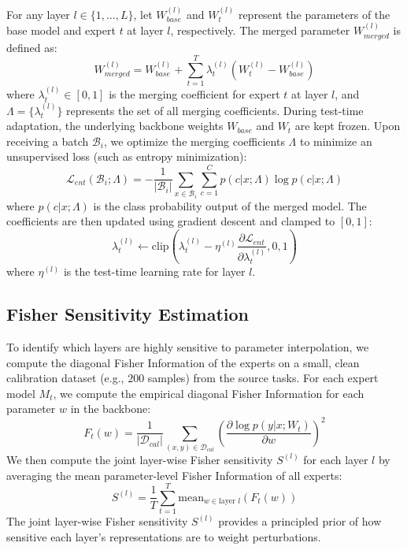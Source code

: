 \documentclass{article}
\theoremstyle{plain}
\theoremstyle{definition}
\theoremstyle{remark}
\begin{document}
For any layer $l \in \{1, \dots, L\}$, let $W_{base}^{(l)}$ and $W_t^{(l)}$ represent the parameters of the base model and expert $t$ at layer $l$, respectively. The merged parameter $W_{merged}^{(l)}$ is defined as:
\begin{equation}
W_{merged}^{(l)} = W_{base}^{(l)} + \sum_{t=1}^T \lambda_{t}^{(l)} \left( W_t^{(l)} - W_{base}^{(l)} \right)
\end{equation}
where $\lambda_{t}^{(l)} \in [0, 1]$ is the merging coefficient for expert $t$ at layer $l$, and $\Lambda = \{\lambda_{t}^{(l)}\}$ represents the set of all merging coefficients. During test-time adaptation, the underlying backbone weights $W_{base}$ and $W_t$ are kept frozen. Upon receiving a batch $\mathcal{B}_i$, we optimize the merging coefficients $\Lambda$ to minimize an unsupervised loss (such as entropy minimization):
\begin{equation}
\label{eq:entropy_loss}
\mathcal{L}_{ent}(\mathcal{B}_i; \Lambda) = -\frac{1}{|\mathcal{B}_i|} \sum_{x \in \mathcal{B}_i} \sum_{c=1}^C p(c|x; \Lambda) \log p(c|x; \Lambda)
\end{equation}
where $p(c|x; \Lambda)$ is the class probability output of the merged model. The coefficients are then updated using gradient descent and clamped to $[0, 1]$:
\begin{equation}
\lambda_{t}^{(l)} \leftarrow \text{clip}\left( \lambda_{t}^{(l)} - \eta^{(l)} \frac{\partial \mathcal{L}_{ent}}{\partial \lambda_{t}^{(l)}}, 0, 1 \right)
\end{equation}
where $\eta^{(l)}$ is the test-time learning rate for layer $l$.

\subsection{Fisher Sensitivity Estimation}
To identify which layers are highly sensitive to parameter interpolation, we compute the diagonal Fisher Information of the experts on a small, clean calibration dataset (e.g., $200$ samples) from the source tasks. For each expert model $M_t$, we compute the empirical diagonal Fisher Information for each parameter $w$ in the backbone:
\begin{equation}
F_{t}(w) = \frac{1}{|\mathcal{D}_{cal}|} \sum_{(x, y) \in \mathcal{D}_{cal}} \left( \frac{\partial \log p(y|x; W_t)}{\partial w} \right)^2
\end{equation}
We then compute the joint layer-wise Fisher sensitivity $S^{(l)}$ for each layer $l$ by averaging the mean parameter-level Fisher Information of all experts:
\begin{equation}
S^{(l)} = \frac{1}{T} \sum_{t=1}^T \text{mean}_{w \in \text{layer } l} \left( F_{t}(w) \right)
\end{equation}
The joint layer-wise Fisher sensitivity $S^{(l)}$ provides a principled prior of how sensitive each layer's representations are to weight perturbations.
\end{document}
